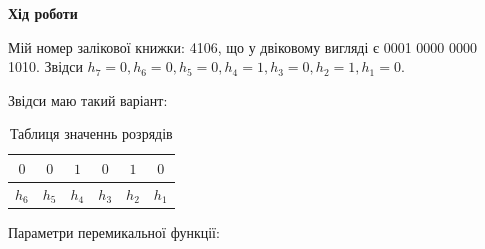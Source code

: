\documentclass[12pt,a4paper]{article}
\begin{document}
    \begin{center} \textbf{\large Хід роботи} \end{center}

    Мій номер залікової книжки: 4106, що у двіковому вигляді є 0001 0000 0000 1010.
    Звідси $h_7 = 0, h_6 = 0, h_5 = 0, h_4 = 1, h_3 = 0, h_2 = 1, h_1 = 0$.

    Звідси маю такий варіант:

    \begin{table}[h]
        \centering
        \renewcommand{\arraystretch}{1.3}
        \begin{tabular}{|cccccc|}
        \hline
        $0$ & $0$ & $1$ & $0$ & $1$ & $0$ \\
        \hline
        $h_6$ & $h_5$ & $h_4$ & $h_3$ & $h_2$ & $h_1$ \\
        \hline
        \end{tabular}
        \caption{Таблиця значеннь розрядів}
    \end{table}

    \noindent
    Параметри перемикальної функції:
\end{document}
